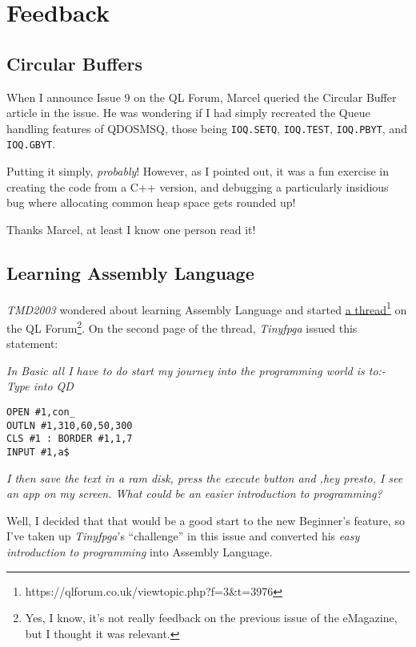 
\chapter{Feedback}

\section{Circular Buffers}

When I announce Issue 9 on the QL Forum, Marcel queried the Circular
Buffer article in the issue. He was wondering if I had simply recreated
the Queue handling features of QDOSMSQ, those being \texttt{IOQ.SETQ},
\texttt{IOQ.TEST}, \texttt{IOQ.PBYT}, and \texttt{IOQ.GBYT}. 

Putting it simply, \emph{probably}! However, as I pointed out, it
was a fun exercise in creating the code from a C++ version, and debugging
a particularly insidious bug where allocating common heap space gets
rounded up!

Thanks Marcel, at least I know one person read it!

\section{Learning Assembly Language}

\emph{TMD2003} wondered about learning Assembly Language and started
\href{https://qlforum.co.uk/viewtopic.php?f=3&t=3976}{a thread}\footnote{https://qlforum.co.uk/viewtopic.php?f=3\&t=3976}
on the QL Forum\footnote{Yes, I know, it's not really feedback on the previous issue of the
eMagazine, but I thought it was relevant.}. On the second page of the thread, \emph{Tinyfpga} issued this statement:

\emph{In Basic all I have to do start my journey into the programming
world is to:- Type into QD}

\begin{lstlisting}
OPEN #1,con_ 
OUTLN #1,310,60,50,300 
CLS #1 : BORDER #1,1,7 
INPUT #1,a$
\end{lstlisting}

\emph{I then save the text in a ram disk, press the execute button
and ,\textquotedbl hey presto\textquotedbl , I see an app on my
screen. What could be an easier introduction to programming?}

Well, I decided that that would be a good start to the new Beginner's
feature, so I've taken up \emph{Tinyfpga}'s ``challenge'' in this
issue and converted his \emph{easy introduction to programming} into
Assembly Language.

